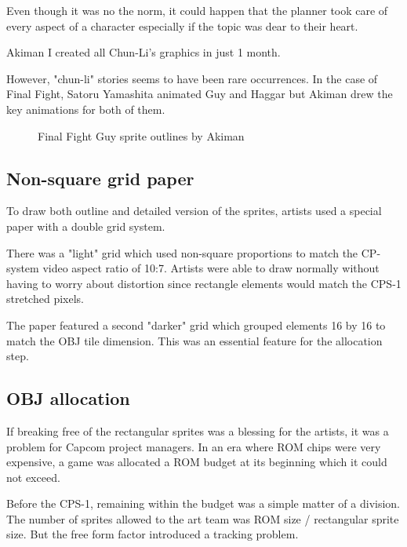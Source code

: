 Even though it was no the norm, it could happen that the planner took care of every aspect of a character especially if the topic was dear to their heart.

\begin{q}{Akiman\cite{gameMaestro4}}
I created all Chun-Li’s graphics in just 1 month.
\end{q}

However, "chun-li" stories seems to have been rare occurrences.   In the case of Final Fight, Satoru Yamashita animated Guy and Haggar but Akiman drew the key animations for both of them.



\begin{figure}[H]
\caption*{Final Fight Guy sprite outlines by Akiman}
\end{figure}




\subsection{Non-square grid paper}
To draw both outline and detailed version of the sprites, artists used a special paper with a double grid system.

There was a "light" grid which used non-square proportions to match the CP-system video aspect ratio of 10:7. Artists were able to draw normally without having to worry about distortion since rectangle elements would match the CPS-1 stretched pixels. 

The paper featured a second "darker" grid which grouped elements 16 by 16 to match the OBJ tile dimension. This was an essential feature for the allocation step.





\subsection{OBJ allocation}

If breaking free of the rectangular sprites was a blessing for the artists, it was a problem for Capcom project managers. In an era where ROM chips were very expensive, a game was allocated a ROM budget at its beginning which it could not exceed.


Before the CPS-1, remaining within the budget was a simple matter of a division. The number of sprites allowed to the art team was ROM size / rectangular sprite size. But the free form factor introduced a tracking problem.



